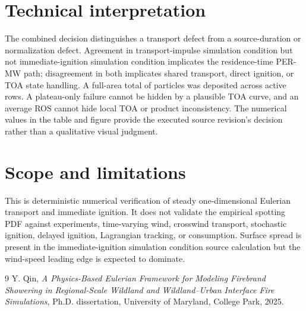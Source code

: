 \section{Technical interpretation}
The combined decision distinguishes a transport defect from a source-duration or
normalization defect. Agreement in transport-impulse simulation condition but not immediate-ignition simulation condition implicates the
residence-time PER-MW path; disagreement in both implicates shared transport,
direct ignition, or TOA state handling. A full-area total of  particles was deposited across  active rows. A plateau-only failure cannot be hidden
by a plausible TOA curve, and an average ROS cannot hide local TOA or product
inconsistency. The numerical values in the table and figure provide the executed
source revision's decision rather than a qualitative visual judgment.

\section{Scope and limitations}
This is deterministic numerical verification of steady one-dimensional Eulerian
transport and immediate ignition. It does not validate the empirical spotting
PDF against experiments, time-varying wind, crosswind transport, stochastic
ignition, delayed ignition, Lagrangian tracking, or consumption. Surface spread
is present in the immediate-ignition simulation condition source calculation but the wind-speed leading edge is
expected to dominate.

\begin{thebibliography}{9}
Y. Qin, \emph{A Physics-Based Eulerian Framework for Modeling Firebrand
Showering in Regional-Scale Wildland and Wildland--Urban Interface Fire
Simulations}, Ph.D. dissertation, University of Maryland, College Park, 2025.
\end{thebibliography}
